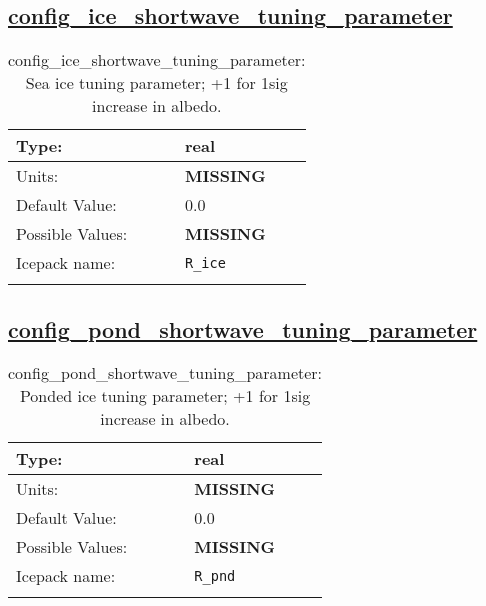 \subsection[config\_ice\_shortwave\_tuning\_parameter]{\hyperref[sec:nm_tab_shortwave]{config\_ice\_shortwave\_tuning\_parameter}}
\label{subsec:nm_sec_config_ice_shortwave_tuning_parameter}
\begin{center}
\begin{longtable}{| p{2.0in} || p{4.0in} |}
    \hline
    Type: & real \\
    \hline
    Units: & {\bf \color{red} MISSING} \\
    \hline
    Default Value: & 0.0 \\
    \hline
    Possible Values: & {\bf \color{red} MISSING} \\
    \hline
    Icepack name: & \verb+R_ice+ \\
    \hline
    \caption{config\_ice\_shortwave\_tuning\_parameter: Sea ice tuning parameter; +1 for 1sig increase in albedo.}
\end{longtable}
\end{center}
\subsection[config\_pond\_shortwave\_tuning\_parameter]{\hyperref[sec:nm_tab_shortwave]{config\_pond\_shortwave\_tuning\_parameter}}
\label{subsec:nm_sec_config_pond_shortwave_tuning_parameter}
\begin{center}
\begin{longtable}{| p{2.0in} || p{4.0in} |}
    \hline
    Type: & real \\
    \hline
    Units: & {\bf \color{red} MISSING} \\
    \hline
    Default Value: & 0.0 \\
    \hline
    Possible Values: & {\bf \color{red} MISSING} \\
    \hline
    Icepack name: & \verb+R_pnd+ \\
    \hline
    \caption{config\_pond\_shortwave\_tuning\_parameter: Ponded ice tuning parameter; +1 for 1sig increase in albedo.}
\end{longtable}
\end{center}
